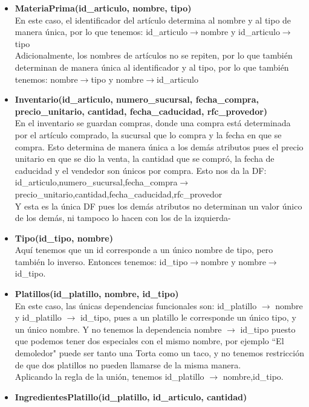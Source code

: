 \documentclass[11pt]{article}
\begin{document}
\begin{itemize}
\item \textbf{MateriaPrima(id\_articulo, nombre, tipo)}\\
En este caso, el identificador del artículo determina al nombre y al tipo de manera única, por lo que tenemos: id\_articulo$\rightarrow$nombre y id\_articulo$\rightarrow$tipo\\
Adicionalmente, los nombres de artículos no se repiten, por lo que también determinan de manera única al identificador y al tipo, por lo que también tenemos: nombre$\rightarrow$tipo y nombre$\rightarrow$id\_articulo
\item \textbf{Inventario(id\_articulo, numero\_sucursal, fecha\_compra, precio\_unitario, cantidad, fecha\_caducidad, rfc\_provedor)}\\
En el inventario se guardan compras, donde una compra está determinada por el artículo comprado, la sucursal que lo compra y la fecha en que se compra. Esto determina de manera única a los demás atributos pues el precio unitario en que se dio la venta, la cantidad que se compró, la fecha de caducidad y el vendedor son únicos por compra. Esto nos da la DF:\\
id\_articulo,numero\_sucursal,fecha\_compra$\rightarrow$ precio\_unitario,cantidad,fecha\_caducidad,rfc\_provedor \\
Y esta es la única DF pues los demás atributos no determinan un valor único de los demás, ni tampoco lo hacen con los de la izquierda-
\item \textbf{Tipo(id\_tipo, nombre)}\\
Aquí tenemos que un id corresponde a un único nombre de tipo, pero también lo inverso. Entonces tenemos: id\_tipo$\rightarrow$nombre y nombre$\rightarrow$id\_tipo.
\item \textbf{Platillos(id\_platillo, nombre, id\_tipo)}\\
En este caso, las únicas dependencias funcionales son: id\_platillo $\rightarrow$ nombre y id\_platillo $\rightarrow$ id\_tipo, pues a un platillo le corresponde un único tipo, y un único nombre. Y no tenemos la dependencia nombre $\rightarrow$ id\_tipo puesto que podemos tener dos especiales con el mismo nombre, por ejemplo ``El demoledor" puede ser tanto una Torta como un taco, y no tenemos restricción de que dos platillos no pueden llamarse de la misma manera.\\
Aplicando la regla de la unión, tenemos id\_platillo $\rightarrow$ nombre,id\_tipo.
\item \textbf{IngredientesPlatillo(id\_platillo, id\_articulo, cantidad)}\\

\end{itemize}
\end{document}
